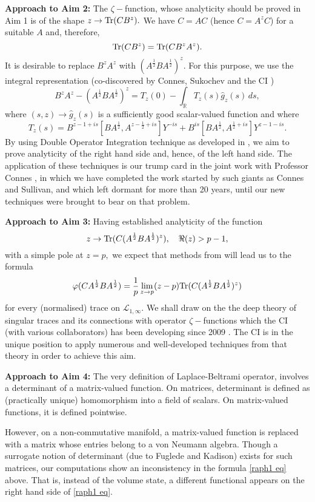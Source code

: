 \documentclass[12pt]{article}
\begin{document}
{\bf Approach to Aim 2:} The $\zeta-$function, whose analyticity should be proved in Aim 1 is of the shape $z\to {\rm Tr}(CB^z).$ We have $C=AC$ (hence $C=A^zC$) for a suitable $A$ and, therefore,
$${\rm Tr}(CB^z)={\rm Tr}(CB^zA^z).$$
It is desirable to replace $B^zA^z$ with $(A^{\frac12}BA^{\frac12})^z.$ For this purpose, we use the integral representation (co-discovered by Connes, Sukochev and the CI \cite{Connes_team})
$$B^zA^z-(A^{\frac{1}{2}}BA^{\frac{1}{2}})^z = T_z(0)-\int_{\mathbb{R}} T_z(s)\widehat{g}_z(s)\,ds,$$ 
where $(s,z)\to\widehat{g}_z(s)$ is a sufficiently good scalar-valued function and where
$$T_z(s)= B^{z-1+is}[BA^{\frac{1}{2}},A^{z-\frac{1}{2}+is}]Y^{-is}+B^{is}[BA^{\frac{1}{2}},A^{\frac{1}{2}+is}]Y^{z-1-is}.$$
By using Double Operator Integration technique as developed in \cite{PotapovSukochev}, we aim to prove analyticity of the right hand side and, hence, of the left hand side. The application of these techniques is our trump card in the joint work with Professor Connes \cite{Connes_team}, in which we have completed the work started by such giants as Connes and Sullivan, and which left dormant for more than 20 years, until our new techniques were brought to bear on that problem.


{\bf Approach to Aim 3:} Having established analyticity of the function
$$z\to {\rm Tr}(C(A^{\frac12}BA^{\frac12})^z),\quad \Re(z)>p-1,$$
with a simple pole at $z=p,$ we expect that methods from \cite{SUZ-indiana} will lead us to the formula
$$\varphi(CA^{\frac12}BA^{\frac12})=\frac1p\lim_{z\to p}(z-p){\rm Tr}(C(A^{\frac12}BA^{\frac12})^z)$$
for every (normalised) trace on $\mathcal{L}_{1,\infty}.$ We shall draw on the the deep theory of singular traces and its connections with operator $\zeta-$functions which the CI (with various collaborators) has been developing since 2009 \cite{book,SUZ-indiana}. The CI is in the unique position to apply numerous and well-developed techniques from that theory in order to achieve this aim.

{\bf Approach to Aim 4:} The very definition of Laplace-Beltrami operator, involves a determinant of a matrix-valued function. On matrices, determinant is defined as (practically unique) homomorphism into a field of scalars. On matrix-valued functions, it is defined pointwise.

However, on a non-commutative manifold, a matrix-valued function is replaced with a matrix whose entries belong to a von Neumann algebra. Though a surrogate notion of determinant (due to Fuglede and Kadison) exists for such matrices, our computations show an inconsistency in the formula \eqref{raph1 eq} above. That is, instead of the volume state, a different functional appears on the right hand side of \eqref{raph1 eq}.
\end{document}
